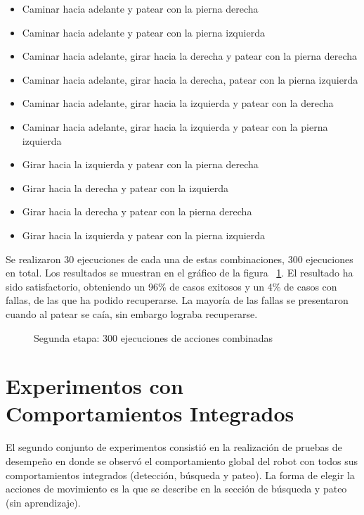 \begin{itemize}
\setlength{\itemsep}{1pt}
\item Caminar hacia adelante y patear con la pierna derecha 
\item Caminar hacia adelante y patear con la pierna izquierda
\item Caminar hacia adelante, girar hacia la derecha y patear con la pierna derecha
\item Caminar hacia adelante, girar hacia la derecha, patear con la pierna izquierda 
\item Caminar hacia adelante, girar hacia la izquierda y patear con la derecha
\item Caminar hacia adelante, girar hacia la  izquierda y  patear con la pierna izquierda
\item Girar hacia la izquierda y patear con la pierna derecha
\item Girar hacia la derecha y patear con la izquierda
\item Girar hacia la derecha y patear con la pierna derecha
\item Girar hacia la izquierda y patear con la pierna izquierda
 \end{itemize}

Se realizaron 30 ejecuciones de cada una de estas combinaciones, 300 ejecuciones en total. Los resultados se muestran en el gráfico de la figura ~\ref{fig:etp2}. El resultado ha sido satisfactorio, obteniendo un 96\% de casos exitosos y un 4\% de casos con fallas, de las que ha podido recuperarse. La mayoría de las fallas se presentaron cuando al patear se caía, sin embargo lograba recuperarse.  

\begin{figure}[th!]
\caption{Segunda etapa: 300 ejecuciones de acciones combinadas}
\label{fig:etp2}
\end{figure}

\section{Experimentos con Comportamientos Integrados}
\label{sec:experimentosintegrados}

El segundo conjunto de experimentos consistió en la realización de pruebas de desempeño en donde se observó el comportamiento global del robot con todos sus comportamientos integrados (detección, búsqueda y pateo). La forma de elegir la acciones de movimiento es la que se describe en la sección de búsqueda y pateo (sin aprendizaje). 


